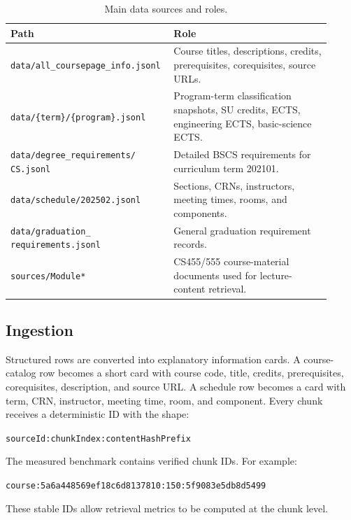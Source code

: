 \documentclass[11pt]{article}
\begin{document}
\begin{table}[H]
\centering
\caption{Main data sources and roles.}
\label{tab:data-sources}
\begin{tabular}{p{0.43\linewidth}p{0.48\linewidth}}
\toprule
Path & Role \\
\midrule
\texttt{data/all\_coursepage\_info.jsonl} & Course titles, descriptions, credits, prerequisites, corequisites, source URLs. \\
\texttt{data/\{term\}/\{program\}.jsonl} & Program-term classification snapshots, SU credits, ECTS, engineering ECTS, basic-science ECTS. \\
\shortstack[l]{\texttt{data/degree\_requirements/}\\\texttt{CS.jsonl}} & Detailed BSCS requirements for curriculum term 202101. \\
\texttt{data/schedule/202502.jsonl} & Sections, CRNs, instructors, meeting times, rooms, and components. \\
\shortstack[l]{\texttt{data/graduation\_}\\\texttt{requirements.jsonl}} & General graduation requirement records. \\
\texttt{sources/Module*} & CS455/555 course-material documents used for lecture-content retrieval. \\
\bottomrule
\end{tabular}
\end{table}

\subsection{Ingestion}


Structured rows are converted into explanatory information cards. A course-catalog row becomes a short card with course code, title, credits, prerequisites, corequisites, description, and source URL. A schedule row becomes a card with term, CRN, instructor, meeting time, room, and component. Every chunk receives a deterministic ID with the shape:

\begin{center}
\texttt{sourceId:chunkIndex:contentHashPrefix}
\end{center}

The measured benchmark contains verified chunk IDs. For example:
\begin{center}
{\scriptsize\texttt{course:5a6a448569ef18c6d8137810:150:5f9083e5db8d5499}}
\end{center}
These stable IDs allow retrieval metrics to be computed at the chunk level.
\end{document}
